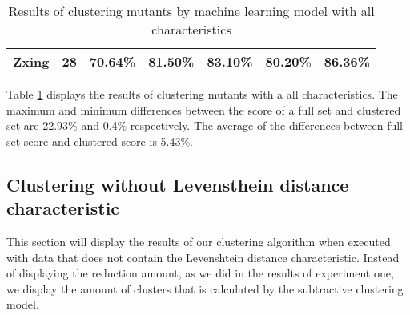 \documentclass[../../main]{subfiles}
\begin{document}
\begin{table}[!htb]
\begin{tabular}{|l|l|l|l|l|l|l|}
Zxing                 & 28                   & 70.64\%                           & 81.50\%                                                & 83.10\%                            & 80.20\%                                                                                                                                    & 86.36\%                                                                                                                                    \\ \hline
\end{tabular}
\caption{\label{tab:ml_full}Results of clustering mutants by machine learning model with all characteristics}
\end{table}
\FloatBarrier
Table \ref{tab:ml_full} displays the results of clustering mutants with a all characteristics.
The maximum and minimum differences between the score of a full set and clustered set are 22.93\% and 0.4\% respectively.
The average of the differences between full set score and clustered score is 5.43\%.
\newpage
\subsection{Clustering without Levensthein distance characteristic}
This section will display the results of our clustering algorithm when executed with data that does not contain the Levenshtein distance characteristic. 
Instead of displaying the reduction amount, as we did in the results of experiment one, we display the amount of clusters that is calculated by the subtractive clustering model.
\end{document}
